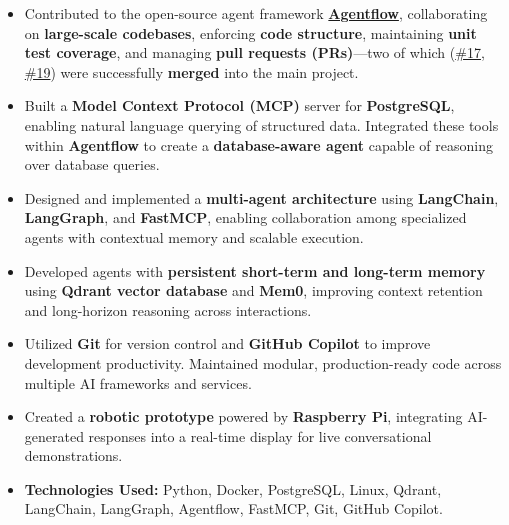 \documentclass[9pt,a4paper]{extarticle}
\begin{document}
\begin{itemize}
    \item Contributed to the open-source agent framework \textbf{\href{https://github.com/10xHub/Agentflow}{Agentflow}}, collaborating on \textbf{large-scale codebases}, enforcing \textbf{code structure}, maintaining \textbf{unit test coverage}, and managing \textbf{pull requests (PRs)}—two of which (\href{https://github.com/10xHub/Agentflow/pull/17}{\#17}, \href{https://github.com/10xHub/Agentflow/pull/19}{\#19}) were successfully \textbf{merged} into the main project.
    
    \item Built a \textbf{Model Context Protocol (MCP)} server for \textbf{PostgreSQL}, enabling natural language querying of structured data. Integrated these tools within \textbf{Agentflow} to create a \textbf{database-aware agent} capable of reasoning over database queries.
    
    \item Designed and implemented a \textbf{multi-agent architecture} using \textbf{LangChain}, \textbf{LangGraph}, and \textbf{FastMCP}, enabling collaboration among specialized agents with contextual memory and scalable execution.
    
    \item Developed agents with \textbf{persistent short-term and long-term memory} using \textbf{Qdrant vector database} and \textbf{Mem0}, improving context retention and long-horizon reasoning across interactions.
    
    \item Utilized \textbf{Git} for version control and \textbf{GitHub Copilot} to improve development productivity. Maintained modular, production-ready code across multiple AI frameworks and services.
    
    \item Created a \textbf{robotic prototype} powered by \textbf{Raspberry Pi}, integrating AI-generated responses into a real-time display for live conversational demonstrations.
    
    \item \textbf{Technologies Used:} Python, Docker, PostgreSQL, Linux, Qdrant, LangChain, LangGraph, Agentflow, FastMCP, Git, GitHub Copilot.
\end{itemize}

\vspace{-0.1cm}
\end{document}
